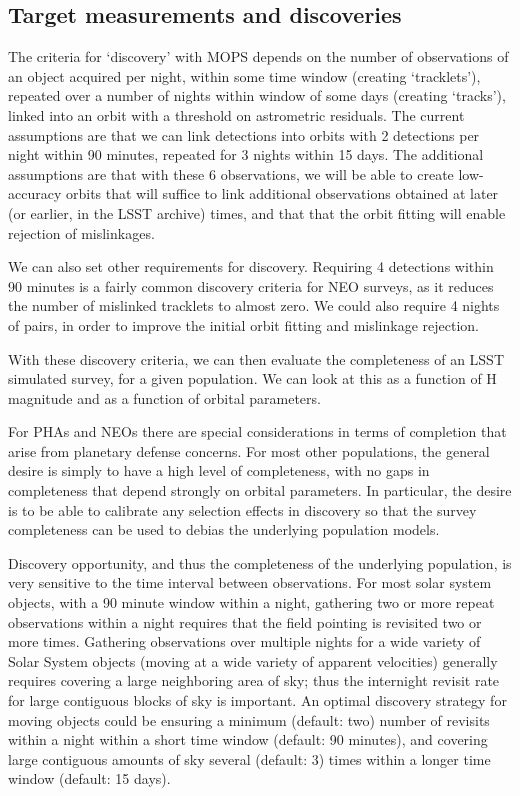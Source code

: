 
\subsection{Target measurements and discoveries}
\label{sec:\secname:targets}

The criteria for `discovery' with MOPS depends on the number
of observations of an object acquired per night, within some time
window (creating `tracklets'), repeated over a number of nights within window of some
days (creating `tracks'), linked into an orbit with a threshold on
astrometric residuals. The current assumptions are that we can link
detections into orbits with 2 detections per night within 90 minutes,
repeated for 3 nights within 15 days. The additional assumptions are
that with these 6 observations, we will be able to create low-accuracy orbits that will suffice to link
additional observations obtained at later (or earlier, in the LSST
archive) times, and that that the orbit fitting will enable rejection
of mislinkages.

We can also set other requirements for discovery. Requiring 4
detections within 90 minutes is a fairly common discovery criteria for
NEO surveys, as it reduces the number of mislinked tracklets to almost
zero. We could also require 4 nights of pairs, in order to improve the
initial orbit fitting and mislinkage rejection.

With these discovery criteria, we can then evaluate the completeness
of an LSST simulated survey, for a given population. We can look at
this as a function of H magnitude and as a function of orbital
parameters.

For PHAs and NEOs there are special considerations in terms of
completion that arise from planetary defense concerns. For most other
populations, the general desire is simply to have a high level of
completeness, with no gaps in completeness that depend strongly on
orbital parameters. In particular, the desire is to be able to
calibrate any selection effects in discovery so that the survey completeness can
be used to debias the underlying population models.

Discovery opportunity, and thus the completeness of the underlying
population, is very sensitive to the time interval between
observations. For most solar system objects, with a 90 minute window
within a night, gathering two or more repeat observations within a night requires
that the field pointing is revisited two or more times. Gathering
observations over multiple nights for a wide variety of Solar System
objects (moving at a wide variety of apparent velocities) generally requires covering a large
neighboring area of sky; thus the internight revisit rate for large contiguous
blocks of sky is important. An optimal discovery strategy for moving
objects could be ensuring a minimum (default: two) number of revisits
within a night within a short time window (default: 90 minutes), and
covering large contiguous amounts of sky several (default: 3) times within a
longer time window (default: 15 days).

